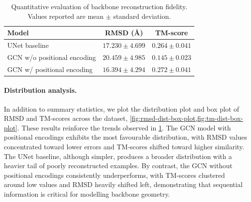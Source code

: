 \documentclass[a4paper,12pt]{article}
\begin{document}
\begin{table}[htbp]
    \centering
    \caption{Quantitative evaluation of backbone reconstruction fidelity. 
    Values reported are mean \(\pm\) standard deviation.}
    \label{tab:quant-results}
    \begin{tabular}{lcc}
        \toprule
        Model & RMSD (\AA) & TM-score \\
        \midrule
        UNet baseline & \(17.230 \pm 4.699\) & \(0.264 \pm 0.041\) \\
        GCN w/o positional encoding & \(20.459 \pm 4.985\) & \(0.145 \pm 0.023\) \\
        GCN w/ positional encoding & \(16.394 \pm 4.294\) & \(0.272 \pm 0.041\) \\
        \bottomrule
    \end{tabular}
\end{table}

\paragraph{Distribution analysis.}
In addition to summary statistics, we plot the distribution plot and box plot of RMSD and TM-scores across the dataset, \cref{fig:rmsd-dist-box-plot,fig:tm-dist-box-plot}. These results reinforce the trends observed in \cref{tab:quant-results}. The GCN model with positional encodings exhibits the most favourable distribution, with RMSD values concentrated toward lower errors and TM-scores shifted toward higher similarity. The UNet baseline, although simpler, produces a broader distribution with a heavier tail of poorly reconstructed examples. By contrast, the GCN without positional encodings consistently underperforms, with TM-scores clustered around low values and RMSD heavily shifted left, demonstrating that sequential information is critical for modelling backbone geometry.
\end{document}
